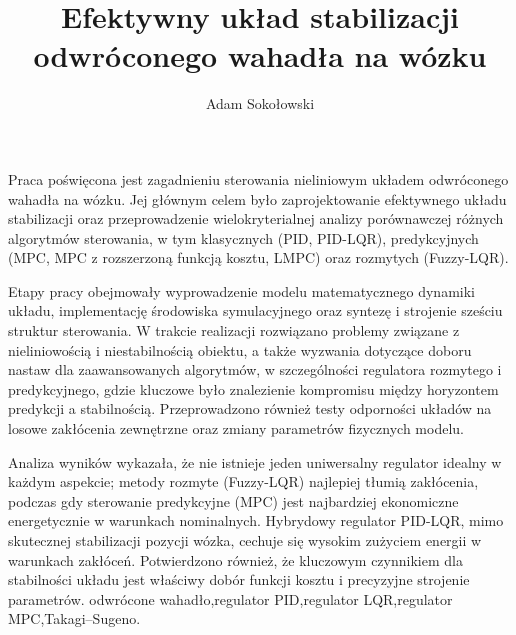 \documentclass[
    left=2.5cm,         %
    right=2.5cm,        %
    top=2.5cm,          %
    bottom=3cm,         %
    bindingoffset=6mm,  %
    nohyphenation=false %
]{eiti/eiti-thesis}
\begin{document}
\EngineerThesis %
{}
\title{
    Efektywny układ stabilizacji odwróconego wahadła na wózku
}
\author{Adam Sokołowski}
\date{\the\year}
\maketitle

\cleardoublepage
\streszczenie

Praca poświęcona jest zagadnieniu sterowania nieliniowym układem odwróconego wahadła na wózku. Jej głównym celem było zaprojektowanie efektywnego układu stabilizacji oraz przeprowadzenie wielokryterialnej analizy porównawczej różnych algorytmów sterowania, w tym klasycznych (PID, PID-LQR), predykcyjnych (MPC, MPC z rozszerzoną funkcją kosztu, LMPC) oraz rozmytych (Fuzzy-LQR).

Etapy pracy obejmowały wyprowadzenie modelu matematycznego dynamiki układu, implementację środowiska symulacyjnego oraz syntezę i strojenie sześciu struktur sterowania. W trakcie realizacji rozwiązano problemy związane z nieliniowością i niestabilnością obiektu, a także wyzwania dotyczące doboru nastaw dla zaawansowanych algorytmów, w szczególności regulatora rozmytego i predykcyjnego, gdzie kluczowe było znalezienie kompromisu między horyzontem predykcji a stabilnością. Przeprowadzono również testy odporności układów na losowe zakłócenia zewnętrzne oraz zmiany parametrów fizycznych modelu.

Analiza wyników wykazała, że nie istnieje jeden uniwersalny regulator idealny w każdym aspekcie; metody rozmyte (Fuzzy-LQR) najlepiej tłumią zakłócenia, podczas gdy sterowanie predykcyjne (MPC) jest najbardziej ekonomiczne energetycznie w warunkach nominalnych. Hybrydowy regulator PID-LQR, mimo skutecznej stabilizacji pozycji wózka, cechuje się wysokim zużyciem energii w warunkach zakłóceń. Potwierdzono również, że kluczowym czynnikiem dla stabilności układu jest właściwy dobór funkcji kosztu i precyzyjne strojenie parametrów.
\slowakluczowe odwrócone wahadło,\allowbreak regulator PID,\allowbreak regulator LQR,\allowbreak regulator MPC,\allowbreak Takagi\allowbreak--\allowbreak Sugeno.
\end{document}
